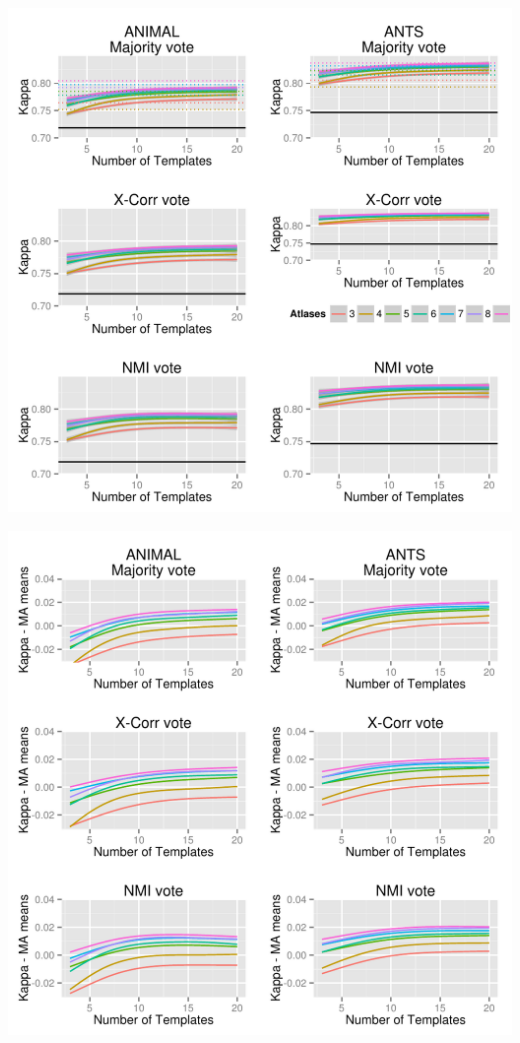 \documentclass{article}\usepackage{graphicx, color}
\makeatletter
\def\maxwidth{ %
  \ifdim\Gin@nat@width>\linewidth
    \linewidth
  \else
    \Gin@nat@width
  \fi
}
\newenvironment{knitrout}{}{} %
\makeatother
\begin{document}
\begin{knitrout}
\color{fgcolor}

{\centering \includegraphics[width=\maxwidth]{figure/a2a1} 

}



{\centering \includegraphics[width=\maxwidth]{figure/a2a2} 

}


\end{knitrout}
\end{document}
